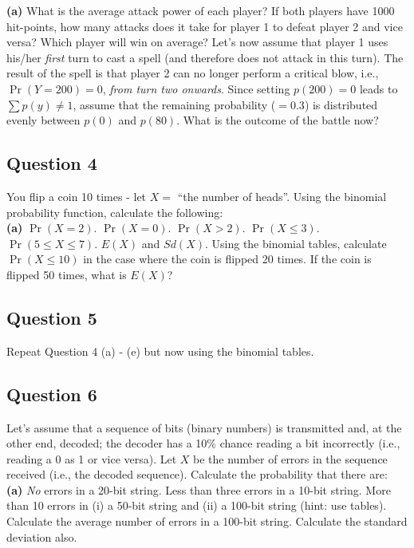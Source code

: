 \documentclass[]{article}
\begin{document}
{\bf(a)} What is the average attack power of each player?  If both players have 1000 hit-points, how many attacks does it take for player 1 to defeat player 2 and vice versa? Which player will win on average?  Let's now assume that player 1 uses his/her \emph{first} turn to cast a spell (and therefore does not attack in this turn). The result of the spell is that player 2 can no longer perform a critical blow, i.e., $\Pr(Y=200) = 0$, \emph{from turn two onwards}. Since setting $p(200) = 0$ leads to $\sum p(y) \ne 1$, assume that the remaining probability ($= 0.3$) is distributed evenly between $p(0)$ and $p(80)$. What is the outcome of the battle now?


\subsection*{Question 4}

You flip a coin 10 times - let $X =$ ``the number of heads''. Using the binomial probability function, calculate the following:\\[-0.2cm]

{\bf(a)} $\Pr(X = 2)$.  $\Pr(X = 0)$.   $\Pr(X > 2)$.  $\Pr(X \le 3)$.  $\Pr(5 \le X \le 7)$.   $E(X)$ and $Sd(X)$.  Using the binomial tables, calculate $\Pr(X \le10)$ in the case where the coin is flipped 20 times.  If the coin is flipped 50 times, what is $E(X)$?

\subsection*{Question 5}

Repeat Question 4 (a) - (e) but now using the binomial tables.



\subsection*{Question 6}

Let's assume that a sequence of bits (binary numbers) is transmitted and, at the other end, decoded; the decoder has a 10\% chance reading a bit incorrectly (i.e., reading a 0 as 1 or vice versa). Let $X$ be the number of errors in the sequence received (i.e., the decoded sequence). Calculate the probability that there are: \\[-0.2cm]

{\bf(a)} \emph{No} errors in a 20-bit string.  Less than three errors in a 10-bit string.  More than 10 errors in (i) a 50-bit string and (ii) a 100-bit string (hint: use tables).  Calculate the average number of errors in a 100-bit string. Calculate the standard deviation also.
\end{document}
